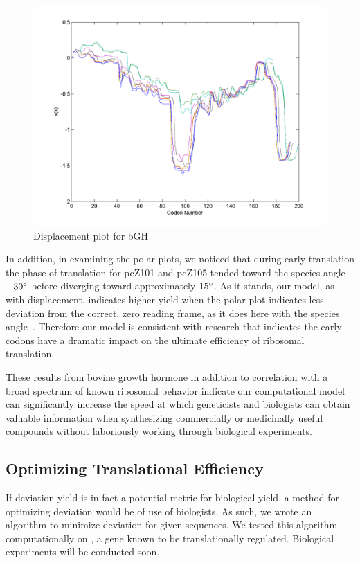 \documentclass[12pt, draft]{article}
\numberwithin{equation}{section}
\begin{document}
\begin{figure}
  \centering
  \caption{Displacement plot for bGH}
  \label{bgh:disp}
  \includegraphics[scale=0.4]{bgh/all}
\end{figure}

In addition, in examining the polar plots, we noticed that during
early translation the phase of translation for pcZ101 and pcZ105 tended toward the species
angle $-30^\circ$ before diverging toward approximately $15^\circ$. As
it stands, our model, as with displacement, indicates higher yield when the polar plot
indicates less deviation from the correct, zero reading frame, as it
does here with the species angle~\cite{lalit:mechanics}. Therefore our
model is consistent with research that indicates
the early codons have a dramatic impact on the ultimate efficiency of
ribosomal translation.

These results from bovine growth hormone in addition to correlation with a broad
spectrum of known ribosomal behavior indicate our computational model
can significantly increase the speed at which geneticists and
biologists can obtain valuable information when synthesizing
commercially or medicinally useful compounds without laboriously
working through biological experiments.

\subsection{Optimizing Translational Efficiency}

If deviation yield is in fact a potential metric for biological yield,
a method for optimizing deviation would be of use of biologists.  As such,
we wrote an algorithm to minimize deviation for given sequences.
We tested this algorithm computationally on \rpoS, a gene known to
be translationally regulated.  Biological experiments will be
conducted soon.
\end{document}
